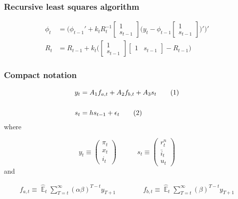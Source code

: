 \documentclass[11pt]{beamer}
\newcommand\numberthis{\addtocounter{equation}{1}\tag{\theequation}} %
\DeclareMathOperator{\E}{\mathbb{E}}
\begin{document}
\begin{frame}[plain]  %
	\frametitle{Recursive least squares algorithm}
	\label{RLS}


\begin{align}
\phi_t  & = \bigg( \phi_{t-1}' + k_t R_t^{-1}\begin{bmatrix} 1 \\ s_{t-1} \end{bmatrix}\bigg(y_{t} - \phi_{t-1} \begin{bmatrix} 1 \\ s_{t-1} \end{bmatrix} \bigg)' \bigg)' \\
R_t &= R_{t-1} +  k_t \bigg( \begin{bmatrix} 1 \\ s_{t-1} \end{bmatrix} \begin{bmatrix} 1 & s_{t-1} \end{bmatrix}  - R_{t-1} \bigg)
\end{align}


\vfill

\hyperlink{anchoring1}{}	


\end{frame}


\begin{frame}[plain]  %
	\frametitle{Compact notation}
	\label{compact}

 \begin{align*}
y_t & = A_1 f_{a,t} + A_2 f_{b,t} + A_3 s_t \label{LOM_LR} \numberthis \\
\\
s_t & = h s_{t-1} + \epsilon_t \label{exog} \numberthis
\end{align*}
where

\begin{equation}
 y_t \equiv \begin{pmatrix} \pi_t \\ x_t \\ i_t
 \end{pmatrix} 
 \quad \quad \quad 
  s_t  \equiv \begin{pmatrix} r_t^n \\ \bar{i}_t \\ u_t 
 \end{pmatrix} 
\end{equation}
and

  \begin{align}
f_{a,t}  \equiv  \hat{\E}_t\sum_{T=t}^{\infty} (\alpha\beta)^{T-t } y_{T+1} \quad \quad \quad \quad 
f_{b,t}  \equiv \hat{\E}_t\sum_{T=t}^{\infty} (\beta)^{T-t } y_{T+1} \label{fafb}
\end{align}

\hyperlink{aggregate_LOMS}{}	


\end{frame}
\end{document}
